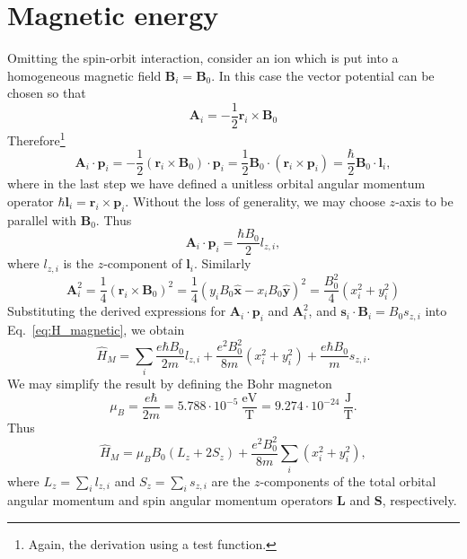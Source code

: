 \section{Magnetic energy}
Omitting the spin-orbit interaction, consider an ion which is put into a homogeneous magnetic field $\mathbf{B}_i = \mathbf{B}_0$. In this case the vector potential can be chosen so that 
\begin{equation}
\mathbf{A}_i = -\frac{1}{2}\mathbf{r}_i \times \mathbf{B}_0
\end{equation}
Therefore\footnote{Again, the derivation using a test function.}
\begin{equation}
\mathbf{A}_i\cdot\mathbf{p}_i = 
-\frac{1}{2} \left(\mathbf{r}_i\times\mathbf{B}_0\right)\cdot \mathbf{p}_i
= \frac{1}{2} \mathbf{B}_0 \cdot  \left(\mathbf{r}_i\times\mathbf{p}_i\right)
= \frac{\hbar}{2} \mathbf{B}_0 \cdot  \mathbf{l}_i, 
\end{equation}
where in the last step we have defined a unitless orbital angular momentum operator $\hbar \mathbf{l}_i = \mathbf{r}_i\times\mathbf{p}_i$. Without the loss of generality, we may choose $z$-axis to be parallel with $\mathbf{B}_0$. Thus
\begin{equation}
\mathbf{A}_i\cdot\mathbf{p}_i = \frac{\hbar B_0}{2} l_{z,i},
\end{equation}
where $l_{z,i}$ is the $z$-component of $\mathbf{l}_i$. Similarly
\begin{equation}
\mathbf{A}_i^2 = \frac{1}{4} (\mathbf{r}_i \times \mathbf{B}_0)^2 =
\frac{1}{4} (y_iB_0\hat{\mathbf{x}} - x_iB_0\hat{\mathbf{y}} )^2 = \frac{B_0^2}{4}(x_i^2+y_i^2)
\end{equation}
Substituting the derived expressions for $\mathbf{A}_i\cdot\mathbf{p}_i$ and $\mathbf{A}_i^2$, and $\mathbf{s}_i\cdot\mathbf{B}_i = B_0 s_{z,i}$ into Eq.~\eqref{eq:H_magnetic}, we obtain
\begin{equation}
\hat{H}_M = \sum_i \frac{e \hbar B_0}{2m}l_{z,i} + \frac{e^2 B_0^2}{8 m} (x_i^2 + y_i^2) + 
\frac{e \hbar B_0}{m} s_{z,i}.
\end{equation}
We may simplify the result by defining the Bohr magneton 
\begin{equation}
\mu_B = \frac{e \hbar}{2 m} = 5.788 \cdot 10^{-5}\ \frac{\mathrm{eV}}{\mathrm{T}} 
= 9.274 \cdot 10^{-24}\ \frac{\mathrm{J}}{\mathrm{T}} .
\end{equation}
Thus
\begin{equation}
\hat{H}_M = \mu_B B_0 (L_z + 2 S_z) + \frac{e^2 B_0^2}{8 m} \sum_i (x_i^2 + y_i^2),
\end{equation}
where $L_z = \sum_i l_{z,i}$ and $S_z = \sum_i s_{z,i}$ are the $z$-components of the total orbital angular momentum and spin angular momentum operators $\mathbf{L}$ and $\mathbf{S}$, respectively.


